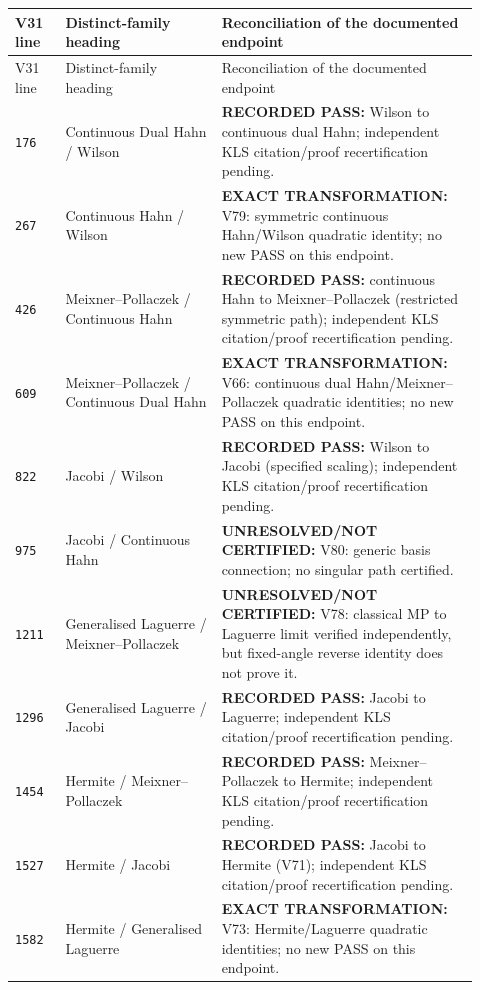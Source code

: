 \documentclass[11pt]{article}
\begin{document}
\begingroup\footnotesize
\begin{longtable}{@{}p{0.10\linewidth}p{0.31\linewidth}p{0.51\linewidth}@{}}
\toprule V31 line & Distinct-family heading & Reconciliation of the documented endpoint \\
\midrule\endfirsthead
\toprule V31 line & Distinct-family heading & Reconciliation of the documented endpoint \\
\midrule\endhead
\bottomrule\endfoot
\texttt{176} & Continuous Dual Hahn / Wilson & \textbf{RECORDED PASS:} Wilson to continuous dual Hahn; independent KLS citation/proof recertification pending. \\
\texttt{267} & Continuous Hahn / Wilson & \textbf{EXACT TRANSFORMATION:} V79: symmetric continuous Hahn/Wilson quadratic identity; no new PASS on this endpoint. \\
\texttt{426} & Meixner--Pollaczek / Continuous Hahn & \textbf{RECORDED PASS:} continuous Hahn to Meixner--Pollaczek (restricted symmetric path); independent KLS citation/proof recertification pending. \\
\texttt{609} & Meixner--Pollaczek / Continuous Dual Hahn & \textbf{EXACT TRANSFORMATION:} V66: continuous dual Hahn/Meixner--Pollaczek quadratic identities; no new PASS on this endpoint. \\
\texttt{822} & Jacobi / Wilson & \textbf{RECORDED PASS:} Wilson to Jacobi (specified scaling); independent KLS citation/proof recertification pending. \\
\texttt{975} & Jacobi / Continuous Hahn & \textbf{UNRESOLVED/NOT CERTIFIED:} V80: generic basis connection; no singular path certified. \\
\texttt{1211} & Generalised Laguerre / Meixner--Pollaczek & \textbf{UNRESOLVED/NOT CERTIFIED:} V78: classical MP to Laguerre limit verified independently, but fixed-angle reverse identity does not prove it. \\
\texttt{1296} & Generalised Laguerre / Jacobi & \textbf{RECORDED PASS:} Jacobi to Laguerre; independent KLS citation/proof recertification pending. \\
\texttt{1454} & Hermite / Meixner--Pollaczek & \textbf{RECORDED PASS:} Meixner--Pollaczek to Hermite; independent KLS citation/proof recertification pending. \\
\texttt{1527} & Hermite / Jacobi & \textbf{RECORDED PASS:} Jacobi to Hermite (V71); independent KLS citation/proof recertification pending. \\
\texttt{1582} & Hermite / Generalised Laguerre & \textbf{EXACT TRANSFORMATION:} V73: Hermite/Laguerre quadratic identities; no new PASS on this endpoint. \\

\end{longtable}
\end{document}
